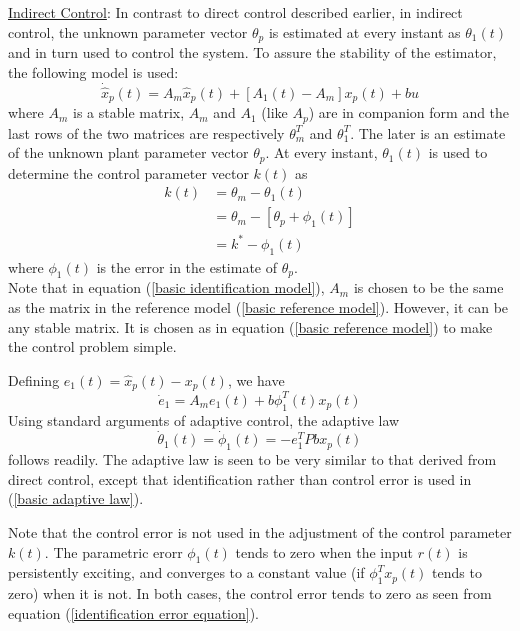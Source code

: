 \documentclass[conference]{IEEEtran}
\begin{document}
{\large \underline{Indirect Control}}: In contrast to direct control described earlier, in indirect control, the unknown parameter vector $\theta_{p}$ is estimated at every instant as $\theta_{1}(t)$ and in turn used to control the system. To assure the stability of the estimator, the following model is used:
\begin{equation}
\label{basic identification model}
\dot{\hat{x}}_{p}(t)=A_{m}\hat{x}_{p}(t)+[A_{1}(t)-A_{m}]x_{p}(t)+bu
\end{equation}
where $A_{m}$ is a stable matrix, $A_{m}$ and $A_{1}$ (like $A_{p}$) are in companion form and the last rows of the two matrices are respectively $\theta_{m}^{T}$ and $\theta_{1}^{T}$. The later is an estimate of the unknown plant parameter vector $\theta_{p}$. At every instant, $\theta_{1}(t)$ is used to determine the control parameter vector $k(t)$ as
\begin{equation*}
\begin{split}
k(t)&=\theta_{m}-\theta_{1}(t)\\
&=\theta_{m}-[\theta_{p}+\phi_{1}(t)]\\
&=k^{*}-\phi_{1}(t)
\end{split}
\end{equation*}
where $\phi_{1}(t)$ is the error in the estimate of $\theta_{p}$.\\

Note that in equation (\ref{basic identification model}), $A_{m}$ is chosen to be the same as the matrix in the reference model (\ref{basic reference model}). However, it can be any stable matrix. It is chosen as in equation (\ref{basic reference model}) to make the control problem simple.


Defining $e_{1}(t)=\hat{x}_{p}(t)-x_{p}(t)$, we have
\begin{equation}
\label{identification error equation}
\dot{e}_{1}=A_{m}e_{1}(t)+b\phi_{1}^{T}(t)x_{p}(t)
\end{equation}
Using standard arguments of adaptive control, the adaptive law
\begin{equation}
\label{basic adaptive law}
\dot{\theta}_{1}(t)=\dot{\phi}_{1}(t)=-e_{1}^{T}Pbx_{p}(t)
\end{equation}
follows readily. The adaptive law is seen to be very similar to that derived from direct control, except that identification rather than control error is used in (\ref{basic adaptive law}).

Note that the control error is not used in the adjustment of the control parameter $k(t)$. The parametric erorr  $\phi_{1}(t)$ tends to zero when the input $r(t)$ is persistently exciting, and converges to a constant value (if $\phi_{1}^{T}x_{p}(t)$ tends to zero) when it is not. In both cases, the control error tends to zero as seen from equation (\ref{identification error equation}).
\end{document}
